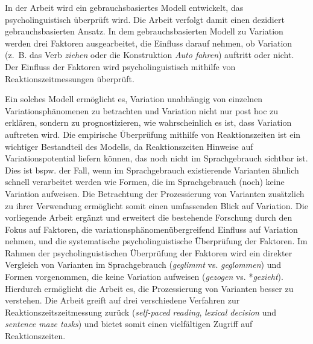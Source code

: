 In der Arbeit wird ein gebrauchsbasiertes Modell entwickelt, das psycholinguistisch überprüft wird. Die Arbeit verfolgt damit einen dezidiert gebrauchsbasierten Ansatz. In dem gebrauchsbasierten Modell zu Variation werden drei Faktoren ausgearbeitet, die Einfluss darauf nehmen, ob Variation (z.~B. das Verb \textit{ziehen} oder die Konstruktion \textit{Auto fahren}) auftritt oder nicht. Der Einfluss der Faktoren wird psycholinguistisch mithilfe von Reaktionszeitmessungen überprüft. 


Ein solches Modell ermöglicht es, Variation unabhängig von einzelnen Variationsphänomenen zu betrachten und Variation nicht nur post hoc zu erklären, sondern zu prognostizieren, wie wahrscheinlich es ist, dass Variation auftreten wird. Die empirische Überprüfung mithilfe von Reaktionszeiten ist ein wichtiger Bestandteil des Modells, da Reaktionszeiten  Hinweise auf Variationspotential liefern können, das noch nicht im Sprachgebrauch sichtbar ist. Dies ist bspw. der Fall, wenn im Sprachgebrauch existierende Varianten ähnlich schnell verarbeitet werden wie Formen, die im Sprachgebrauch (noch) keine Variation aufweisen. Die Betrachtung der Prozessierung von Varianten zusätzlich zu ihrer Verwendung ermöglicht somit einen umfassenden Blick auf Variation. Die vorliegende Arbeit ergänzt und erweitert die bestehende Forschung durch den Fokus auf Faktoren, die variationsphänomenübergreifend Einfluss auf Variation nehmen, und die systematische psycholinguistische Überprüfung der Faktoren. Im Rahmen der psycholinguistischen Überprüfung der Faktoren wird ein direkter Vergleich von Varianten im Sprachgebrauch (\textit{geglimmt} vs. \textit{geglommen}) und Formen vorgenommen, die keine Variation aufweisen (\textit{gezogen} vs. *\textit{gezieht}). Hierdurch ermöglicht die Arbeit es, die Prozessierung von Varianten besser zu verstehen. Die Arbeit greift auf drei verschiedene Verfahren zur Reaktionszeitszeitmessung zurück (\textit{self-paced reading}, \textit{lexical decision} und \textit{sentence maze tasks}) und bietet somit einen vielfältigen Zugriff auf Reaktionszeiten.


